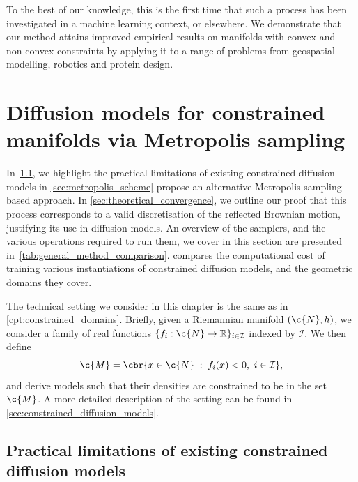 To the best of our knowledge, this is the first time that such a process has been investigated in a machine learning context, or elsewhere.
We demonstrate that our method attains improved empirical results on manifolds with convex and non-convex constraints by applying it to a range of problems from geospatial modelling, robotics and protein design.

\section{Diffusion models for constrained manifolds via Metropolis sampling}
\label{sec:methodology}

In~\cref{sec:practical_constraints}, we highlight the practical limitations of existing constrained diffusion models in \cref{sec:metropolis_scheme} propose an alternative Metropolis sampling-based approach.
In \cref{sec:theoretical_convergence}, we outline our proof that this process corresponds to a valid discretisation of the reflected Brownian motion, justifying its use in diffusion models.
An overview of the samplers, and the various operations required to run them, we cover in this section are presented in~\cref{tab:general_method_comparison}.
 compares the computational cost of training various instantiations of constrained diffusion models, and the geometric domains they cover.

The technical setting we consider in this chapter is the same as in \cref{cpt:constrained_domains}.
Briefly, given a Riemannian manifold \((\c{N}, {h})\), we consider a family of real functions \(\{f_i: \c{N} \to \R\}_{i \in \mathcal{I}}\) indexed by \(\mathcal{I}\).
We then define \begin{equation} \label{eq:constrained} \c{M} = \cbr{x \in \c{N} \; : \; f_i(x) < 0 , \ i \in \mathcal{I}},
\end{equation}
and derive models such that their densities are constrained to be in the set \(\c{M}\).
A more detailed description of the setting can be found in \cref{sec:constrained_diffusion_models}.

\subsection{Practical limitations of existing constrained diffusion models}
\label{sec:practical_constraints}

